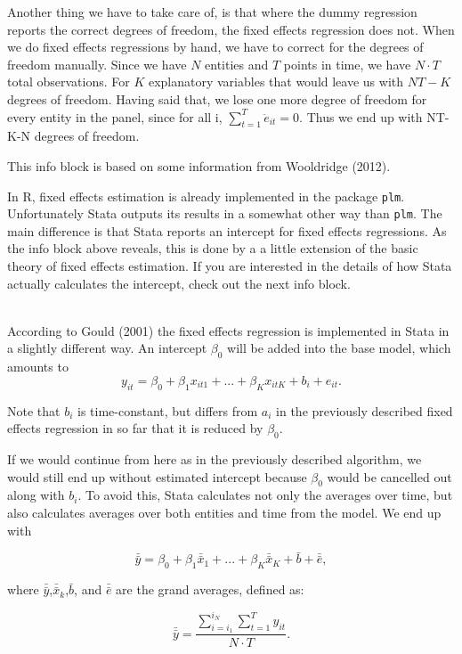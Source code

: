 \documentclass[a4paper,11pt,abstract=on]{scrartcl}
\newcommand{\infobox}[2]{\begin{mdframed}[linewidth=0.8pt, innerleftmargin = 0.8cm, innerrightmargin = 0.8cm, innertopmargin = 0.8cm, innerbottommargin = 0.8cm,skipabove=0.5cm,skipbelow=1.5cm]{
\sf{\textbf{#1} }\\  #2 
}\end{mdframed}}
\begin{document}
{{Another thing we have to take care of, is that where the dummy
regression reports the correct degrees of freedom, the fixed effects
regression does not. When we do fixed effects regressions by hand, we
have to correct for the degrees of freedom manually. Since we have $N$
entities and $T$ points in time, we have $N \cdot T$ total observations.
For $K$ explanatory variables that would leave us with $NT-K$ degrees of
freedom. Having said that, we lose one more degree of freedom for every
entity in the panel, since for all i,
$\sum\limits_{t=1}^T \ddot{e}_{it} = 0$. Thus we end up with NT-K-N
degrees of freedom.

This info block is based on some information from Wooldridge (2012).
}

In R, fixed effects estimation is already implemented in the package
\texttt{plm}. Unfortunately Stata outputs its results in a somewhat
other way than \texttt{plm}. The main difference is that Stata reports
an intercept for fixed effects regressions. As the info block above
reveals, this is done by a a little extension of the basic theory of
fixed effects estimation. If you are interested in the details of how
Stata actually calculates the intercept, check out the next info block.

\infobox{Info: Fixed effects regression in Stata}{

According to Gould (2001) the fixed effects regression is implemented in
Stata in a slightly different way. An intercept $\beta_0$ will be added
into the base model, which amounts to
\[ y_{it} = \beta_0 + \beta_1 x_{it1} + ... +  \beta_K x_{itK}  + b_i + e_{it}.\]

Note that $b_i$ is time-constant, but differs from $a_i$ in the
previously described fixed effects regression in so far that it is
reduced by $\beta_0$.

If we would continue from here as in the previously described algorithm,
we would still end up without estimated intercept because $\beta_0$
would be cancelled out along with $b_i$. To avoid this, Stata calculates
not only the averages over time, but also calculates averages over both
entities and time from the model. We end up with

\[\bar{\bar{y}} = \beta_0 + \beta_1 \bar{\bar{x}}_{1} + ... + \beta_K \bar{\bar{x}}_{K}+ \bar{b} + \bar{\bar{e}},\]

where $\bar{\bar{y}}$,$\bar{\bar{x}}_k$,$\bar{b}$, and $\bar{\bar{e}}$
are the grand averages, defined as:

\[\bar{\bar{y}} =\frac{\sum_{i=i_1}^{i_N} \sum_{t=1}^T y_{it}}{N \cdot T}.\]

}}
\end{document}
